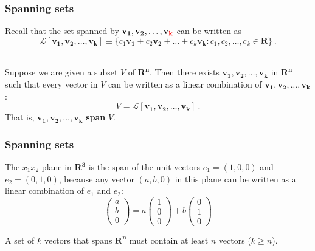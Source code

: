 \documentclass[10pt, handout]{beamer}
\begin{document}
\begin{frame}
\frametitle{Spanning sets} \vskip 0.1in

Recall that the set spanned by  $\mathbf{v_1}, \mathbf{v_2}, \ldots , \mathbf{v_{\color{red}k}}$ can be written as $$\mathcal{L}[ \mathbf{v_1}, \mathbf{v_2}, \ldots , \mathbf{v_{k}}] \equiv \{ c_1\mathbf{v_1} + c_2\mathbf{v_2} + \ldots + c_k\mathbf{v_k} : c_1, c_2, \ldots, c_k \in \mathbf{R} \} ~.$$ \\ \vskip0.1in

Suppose we are given a subset $V$ of $\mathbf{R^n}$. Then there exists
$\mathbf{v_1}, \mathbf{v_2}, \ldots , \mathbf{v_{k}}$ in $\mathbf{R^n}$ such that every vector in $V$ can be written as a linear combination of $\mathbf{v_1}, \mathbf{v_2}, \ldots , \mathbf{v_{k}}$: $$V = \mathcal{L}[\mathbf{v_1}, \mathbf{v_2}, \ldots , \mathbf{v_{k}}] ~.$$
That is, $\mathbf{v_1}, \mathbf{v_2}, \ldots , \mathbf{v_{k}}$ \textbf{span} $V$. 


\end{frame}

\begin{frame}
\frametitle{Spanning sets} \vskip 0.1in



\begin{example}[11.4]
The $x_{1}x_{2}$-plane in $\mathbf{R^3}$ is the span of the unit vectors $e_1 = (1, 0, 0)$ and $e_2 = (0, 1, 0)$, because any vector $(a,b,0)$ in this plane can be written as a linear combination of $e_1$ and $e_2$:
$$ \begin{pmatrix} a \\ b \\ 0 \end{pmatrix} = a \begin{pmatrix} 1 \\ 0 \\ 0 \end{pmatrix} + b \begin{pmatrix} 0 \\ 1 \\ 0 \end{pmatrix} $$
\end{example}

\begin{theorem}[11.6]
A set of $k$ vectors that spans $\mathbf{R^n}$ must contain at least $n$ vectors ($k \geq n$).
\end{theorem}


\end{frame}
\end{document}
